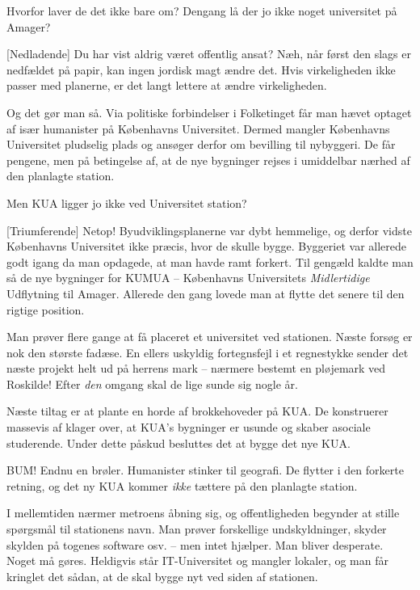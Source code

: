 \documentclass[a4paper,11pt]{article}
\begin{document}
\begin{sketch}
 Hvorfor laver de det ikke bare om? Dengang lå der jo ikke noget
universitet på Amager?

[Nedladende] Du har vist aldrig været offentlig ansat? Næh, når først
den slags er nedfældet på papir, kan ingen jordisk magt ændre det. Hvis
virkeligheden ikke passer med planerne, er det langt lettere at ændre
virkeligheden.

Og det gør man så. Via politiske forbindelser i Folketinget får man hævet optaget
af især humanister på Københavns Universitet. Dermed mangler Københavns
Universitet pludselig plads og ansøger derfor om bevilling til nybyggeri. De får
pengene, men på betingelse af, at de nye bygninger rejses i umiddelbar nærhed af
den planlagte station.

 Men KUA ligger jo ikke ved Universitet station?

[Triumferende] Netop! Byudviklingsplanerne var dybt hemmelige, og derfor
vidste Københavns Universitet ikke præcis, hvor de skulle bygge. Byggeriet var
allerede godt igang da man opdagede, at man havde ramt forkert. Til gengæld
kaldte man så de nye bygninger for KUMUA -- Københavns Universitets
\emph{Midlertidige} Udflytning til Amager. Allerede den gang lovede man at flytte
det senere til den rigtige position.

Man prøver flere gange at få placeret et universitet ved stationen.  Næste forsøg
er nok den største fadæse. En ellers uskyldig fortegnsfejl i et regnestykke
sender det næste projekt helt ud på herrens mark -- nærmere bestemt en pløjemark
ved Roskilde! Efter \emph{den} omgang skal de lige sunde sig nogle år.

Næste tiltag er at plante en horde af brokkehoveder på KUA. De konstruerer
massevis af klager over, at KUA's bygninger er usunde og skaber asociale
studerende. Under dette påskud besluttes det at bygge det nye KUA.

 BUM! Endnu en brøler.
Humanister stinker til geografi. De flytter i den forkerte retning, og det ny KUA
kommer \emph{ikke} tættere på den planlagte station.

I mellemtiden nærmer metroens åbning sig, og offentligheden begynder at stille
spørgsmål til stationens navn. Man prøver forskellige undskyldninger, skyder
skylden på togenes software osv. -- men intet hjælper. Man bliver
desperate. Noget må gøres. Heldigvis står IT-Universitet og mangler lokaler,
og man får kringlet det sådan, at de skal bygge nyt ved siden af stationen.


\end{sketch}
\end{document}
